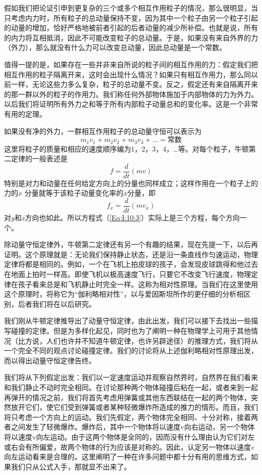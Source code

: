 假如我们把论证引申到更复杂的三个或多个相互作用粒子的情况，那么很明显，当只考虑内力时，所有粒子的总动量保持不变，因为其中一个粒子由另一个粒子引起的动量的增加，恰好严格地被前者引起的后者动量的减少所补偿。也就是说，所有的内力将互相抵消，因此不可能改变粒子的总动量。于是，如果没有来自外界的力（外力），那么就没有什么力可以改变总动量，因此总动量是一个常数。

值得一提的是，如果存在一些并非来自所说的粒子间的相互作用的力：假定我们把相互作用的粒子隔离开来，这时会出现什么情况？如果只有相互作用力，那么同以前一样，无论这些力多么复杂，粒子的总动量不变。反之，假定还有来自隔离开来的那一群以外的粒子的作用力。我们称任何外部物体施加于内部物体的力为外力。以后我们将证明所有外力之和等于所有内部粒子动量总和的变化率。这是一个非常有用的定理。

如果没有净的外力，一群相互作用粒子的总动量守恒可以表示为
\begin{equation}
    \label{Eq:I:10:3}
    m_1v_1+m_2v_2+m_3v_3+...=\text{常数}
\end{equation}
这里将粒子的质量和相应的速度顺序编为1，2，3，4，…等。对每个粒子，牛顿第二定律的一般表述是
\begin{equation}
    \label{Eq:I:10:4}
    f=\frac{d}{dt}(mv)
\end{equation}
特别是对力和动量在任何给定方向上的分量也同样成立；这样作用在一个粒子上的力的$x$
分量就等于该粒子动量变化率的$x$分量，即
\begin{equation}
    \label{Eq:I:10:5}
    f_x=\frac{d}{dt}(mv_x)
\end{equation}
对$y$和$z$方向也如此。所以方程式（\ref{Eq:I:10:3}）实际上是三个方程，每个方向一个。

除动量守恒定律外，牛顿第二定律还有另一个有趣的结果，现在先提一下，以后再证明。这个原理就是：无论我们保持静止状态，还是沿一条直线作匀速运动，物理定律将都是相同的。例如，一个在飞机上拍皮球的孩子，会发现皮球跳得和他过去在地面上拍时一样高。即使飞机以极高速度飞行，只要它不改变飞行速度，物理定律在孩子看来总是和飞机静止时完全一样。这称为相对性原理。当我们在这里使用这个原理时，将称它为“伽利略相对性”，以与爱因斯坦所作的更仔细的分析相区别，后者我们将在以后研究。

我们刚从牛顿定律推导出了动量守恒定律，由此出发，我们可以接下去找出一些描写碰撞的定律。但是为多样化起见，同时也为了阐明一种在物理学上可用于其他情况（比方说，人们也许并不知道牛顿定律，也许另辟途径）的推理方式，我们将从一个完全不同的观点讨论碰撞定律。我们的讨论将从上述伽利略相对性原理出发，而以得出动量守恒定律告终。

我们将从下列假定出发：我们以一定速度运动并观察自然界时，自然界在我们看来和我们静止不动时完全相同。在讨论那种两个物体碰撞后粘在一起，或者来到一起再弹开的情况之前，我们将首先考虑用弹簧或其他东西联结在一起的两个物体，突然放开它们，使它们受到弹簧或者某种轻微爆炸所造成的推力的情形。而且，我们将只考虑一个方向上的运动。我们先假定，两个物体完全相同、十分对称，接着两者之间发生了轻微爆炸。爆炸后，其中一个物体将以速度v向右运动，另一个物体将以速度v向左运动。由于这两个物体是全同的，因而没有什么理由认为它们对左或右会有所偏爱，故两个物体的行为应该是对称的。因此，认定另一物体以速度$v$向左运动看来是合理的。这里阐明了一种在许多问题中都十分有用的思维方式，如果我们只从公式入手，那就显不出来了。

